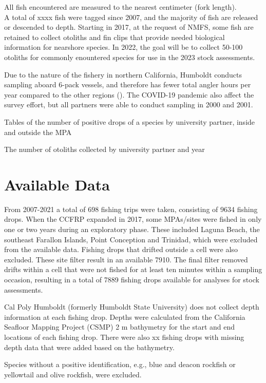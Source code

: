 \documentclass[
]{article}
\begin{document}
All fish encountered are measured to the nearest centimeter (fork length).\\
A total of xxxx fish were tagged since 2007, and the majority of fish are
released or descended to depth. Starting in 2017, at the request of NMFS, some
fish are retained to collect otoliths and fin clips that provide needed
biological information for nearshore species. In 2022, the goal will be to collect
50-100 otoliths for commonly enountered species for use in the 2023 stock assessments.

Due to the nature of the fishery in northern California, Humboldt conducts sampling aboard 6-pack
vessels, and therefore has fewer total angler hours per year compared to the
other regions (). The COVID-19 pandemic also affect the survey effort, but all
partners were able to conduct sampling in 2000 and 2001.

Tables of the number of positive drops of a species by university partner,
inside and outside the MPA

The number of otoliths collected by university partner and year

\hypertarget{available-data}{%
\section{Available Data}\label{available-data}}

From 2007-2021 a total of 698 fishing trips
were taken, consisting of 9634 fishing drops. When the CCFRP
expanded in 2017, some MPAs/sites were fished in only one or two years during an
exploratory phase. These included Laguna Beach, the southeast Farallon Islands,
Point Conception and Trinidad, which were excluded from the available data.
Fishing drops that drifted outside a cell were also excluded. These site filter
result in an available 7910. The final filter removed
drifts within a cell that were not fished for at least ten minutes within a sampling
occasion, resulting in a total of 7889 fishing
drops available for analyses for stock assessments.

Cal Poly Humboldt (formerly Humboldt State University) does not collect depth
information at each fishing drop. Depths
were calculated from the California Seafloor Mapping Project (CSMP) 2 m bathymetry
for the start and end locations of each fishing drop. There were also xx fishing
drops with missing depth data that were added based on the bathymetry.

Species without a positive identification, e.g., blue and deacon rockfish or
yellowtail and olive rockfish, were excluded.
\end{document}
